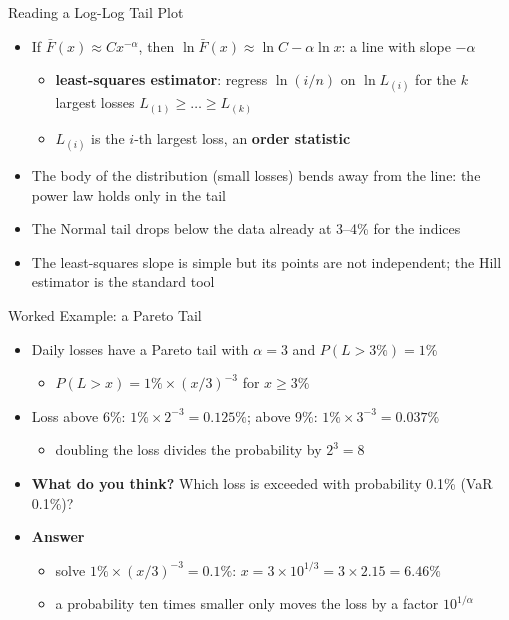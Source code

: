 \begin{frame}{Reading a Log-Log Tail Plot}
\itemsize{\small}
\begin{itemize}
    \item If $\bar F(x) \approx C x^{-\alpha}$, then $\ln \bar F(x) \approx \ln C - \alpha \ln x$: a line with slope $-\alpha$
    \begin{itemize}
        \item \textbf{least-squares estimator}: regress $\ln(i/n)$ on $\ln L_{(i)}$ for the $k$ largest losses $L_{(1)} \ge \dots \ge L_{(k)}$
        \item $L_{(i)}$ is the $i$-th largest loss, an \textbf{order statistic}
    \end{itemize}
    \item The body of the distribution (small losses) bends away from the line: the power law holds only in the tail
    \item The Normal tail drops below the data already at 3--4\% for the indices
    \item The least-squares slope is simple but its points are not independent; the Hill estimator is the standard tool
\end{itemize}
\end{frame}

\begin{frame}{Worked Example: a Pareto Tail}
\itemsize{\small}
\begin{itemize}
    \item Daily losses have a Pareto tail with $\alpha = 3$ and $P(L > 3\%) = 1\%$
    \begin{itemize}
        \item $P(L > x) = 1\% \times (x/3)^{-3}$ for $x \ge 3\%$
    \end{itemize}
    \item Loss above 6\%: $1\% \times 2^{-3} = 0.125\%$; above 9\%: $1\% \times 3^{-3} = 0.037\%$
    \begin{itemize}
        \item doubling the loss divides the probability by $2^3 = 8$
    \end{itemize}
    \item \textbf{What do you think?} Which loss is exceeded with probability 0.1\% (VaR 0.1\%)?
    \item \textbf{Answer}
    \begin{itemize}
        \item solve $1\% \times (x/3)^{-3} = 0.1\%$: $x = 3 \times 10^{1/3} = 3 \times 2.15 = 6.46\%$
        \item a probability ten times smaller only moves the loss by a factor $10^{1/\alpha}$
    \end{itemize}
\end{itemize}
\end{frame}


